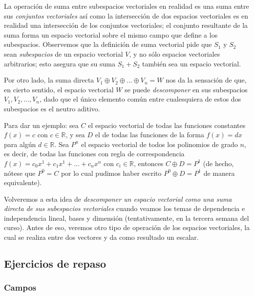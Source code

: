 \documentclass[12pt]{article}
\begin{document}
La operación de suma entre subespacios vectoriales en realidad es una suma entre sus \emph{conjuntos vectoriales} \textemdash así como la intersección de dos espacios vectoriales es en realidad una intersección de los conjuntos vectoriales\textemdash; el conjunto resultante de la suma forma un espacio vectorial sobre el mismo campo que define a los subespacios. Observemos que la definición de suma vectorial pide que $S_1$ y $S_2$ sean \emph{subespacios} de un espacio vectorial $V$, y no sólo espacios vectoriales arbitrarios; esto asegura que su suma $S_1+S_2$ también sea un espacio vectorial.

Por otro lado, la suma directa $V_1\oplus V_2\oplus...\oplus V_n=W$ nos da la sensación de que, en cierto sentido, el espacio vectorial $W$ se puede \emph{descomponer} en sus subespacios $V_1, V_2,...,V_n$, dado que el único elemento común entre cualesquiera de estos dos subespacios es el neutro aditivo.

\vspace{3mm}

Para dar un ejemplo: sea $C$ el espacio vectorial de todas las funciones constantes $f(x) = c$ con $c\in\mathbb{R}$, y sea $D$ el de todas las funciones de la forma $f(x) = d x$ para algún $d\in\mathbb{R}$. Sea $P^n$ el espacio vectorial de todos los polinomios de grado $n$, es decir, de todas las funciones con regla de correspondencia $f(x) = c_0 x^1 + c_1 x^1 + ... + c_n x^n$ con $c_i\in\mathbb{R}$, entonces $C\oplus D = P^1$ (de hecho, nótese que $P^0=C$ por lo cual pudimos haber escrito $P^0\oplus D=P^1$ de manera equivalente).

\vspace{3mm}

Volveremos a esta idea de \emph{descomponer un espacio vectorial como una suma directa de sus subespacios vectoriales} cuando veamos los temas de dependencia e independencia lineal, bases y dimensión (tentativamente, en la tercera semana del curso). Antes de eso, veremos otro tipo de operación de los espacios vectoriales, la cual se realiza entre dos vectores y da como resultado un escalar.

\newpage
\subsection{Ejercicios de repaso}

\subsubsection{Campos}
\end{document}
